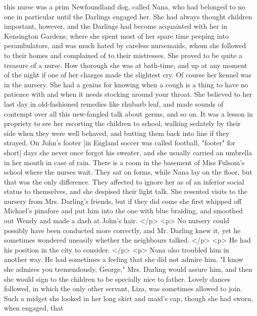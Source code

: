       this nurse was a prim Newfoundland dog, called Nana, who had belonged to
      no one in particular until the Darlings engaged her. She had always
      thought children important, however, and the Darlings had become
      acquainted with her in Kensington Gardens, where she spent most of her
      spare time peeping into perambulators, and was much hated by careless
      nursemaids, whom she followed to their homes and complained of to their
      mistresses. She proved to be quite a treasure of a nurse. How thorough she
      was at bath-time, and up at any moment of the night if one of her charges
      made the slightest cry. Of course her kennel was in the nursery. She had a
      genius for knowing when a cough is a thing to have no patience with and
      when it needs stocking around your throat. She believed to her last day in
      old-fashioned remedies like rhubarb leaf, and made sounds of contempt over
      all this new-fangled talk about germs, and so on. It was a lesson in
      propriety to see her escorting the children to school, walking sedately by
      their side when they were well behaved, and butting them back into line if
      they strayed. On John's footer [in England soccer was called football,
      "footer" for short] days she never once forgot his sweater, and she
      usually carried an umbrella in her mouth in case of rain. There is a room
      in the basement of Miss Fulsom's school where the nurses wait. They sat on
      forms, while Nana lay on the floor, but that was the only difference. They
      affected to ignore her as of an inferior social status to themselves, and
      she despised their light talk. She resented visits to the nursery from
      Mrs. Darling's friends, but if they did come she first whipped off
      Michael's pinafore and put him into the one with blue braiding, and
      smoothed out Wendy and made a dash at John's hair.
    </p>
    <p>
      No nursery could possibly have been conducted more correctly, and Mr.
      Darling knew it, yet he sometimes wondered uneasily whether the neighbours
      talked.
    </p>
    <p>
      He had his position in the city to consider.
    </p>
    <p>
      Nana also troubled him in another way. He had sometimes a feeling that she
      did not admire him. "I know she admires you tremendously, George," Mrs.
      Darling would assure him, and then she would sign to the children to be
      specially nice to father. Lovely dances followed, in which the only other
      servant, Liza, was sometimes allowed to join. Such a midget she looked in
      her long skirt and maid's cap, though she had sworn, when engaged, that
